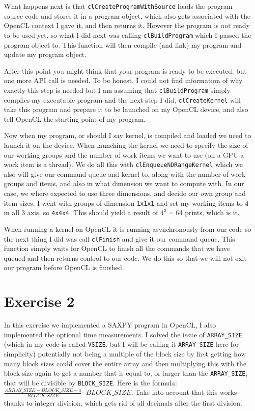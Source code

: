 \documentclass[a4paper, 12pt]{article}
\def\code#1{\texttt{#1}}
\begin{document}
What happens next is that \code{clCreateProgramWithSource} loads the program source code and stores it in a program object, which also gets associated with the OpenCL context I gave it, and then returns it.
However the program is not ready to be used yet, so what I did next was calling \code{clBuildProgram} which I passed the program object to. This function will then compile (and link) my program and update my program object.

After this point you might think that your program is ready to be executed, but one more API call is needed. To be honest, I could not find information of why exactly this step is needed but I am assuming that \code{clBuildProgram} simply compiles my executable program and the next step I did, \code{clCreateKernel} will take this program and prepare it to be launched on my OpenCL device, and also tell OpenCL the starting point of my program.

Now when my program, or should I say kernel, is compiled and loaded we need to launch it on the device. When launching the kernel we need to specify the size of our working groups and the number of work items we want to use (on a GPU a work item is a thread). We do all this with \code{clEnqueueNDRangeKernel} which we also will give our command queue and kernel to, along with the number of work groups and items, and also in what dimension we want to compute with. In our case, we where expected to use three dimensions, and decide our own group and item sizes. I went with groups of dimension \code{1x1x1} and set my working items to 4 in all 3 axis, so \code{4x4x4}. This should yield a result of $4^3 = 64$ prints, which is it.

When running a kernel on OpenCL it is running asynchronously from our code so the next thing I did was call \code{clFinish} and give it our command queue. This function simply waits for OpenCL to finish all the commands that we have queued and then returns control to our code. We do this so that we will not exit our program before OpenCL is finished.

\section{Exercise 2}
In this exercise we implemented a SAXPY program in OpenCL, I also implemented the optional time measurements. I solved the issue of \code{ARRAY\_SIZE} (which in my code is called \code{VSIZE}, but I will be calling it \code{ARRAY\_SIZE} here for simplicity) potentially not being a multiple of the block size by first getting how many block sizes could cover the entire array and then multiplying this with the block size again to get a number that is equal to, or larger than the \code{ARRAY\_SIZE}, that will be divisible by \code{BLOCK\_SIZE}. Here is the formula: $\frac{ARRAY\_SIZE + BLOCK\_SIZE - 1}{BLOCK\_SIZE} \cdot BLOCK\_SIZE$. Take into account that this works thanks to integer division, which gets rid of all decimals after the first division.
\end{document}
